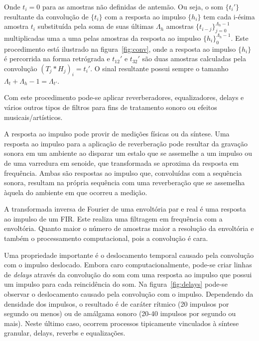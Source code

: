 \begin{itemize}
Onde $t_i=0$ para as
amostras não definidas de antemão.
Ou seja, o som $\{t_i'\}$ resultante da convolução de $\{t_i\}$ com a resposta ao impulso $\{h_i\}$
tem cada i-ésima amostra $t_i$ substituída pela soma de suas últimas $\Lambda_h$ amostras $\{t_{i-j}\}_{j=0}^{\Lambda_h-1}$
multiplicadas uma a uma pelas amostras da resposta ao impulso $\{h_i\}_0^{\Lambda_h-1}$. Este
procedimento está ilustrado na figura~\ref{fig:conv}, onde a resposta ao impulso $\{h_i\}$
é percorrida na forma retrógrada e
$t_{12}'$ e $t_{32}'$ são duas amostras calculadas
pela convolução $(T_j*H_j)_i=t_i'$. O sinal resultante possui
sempre o tamanho $\Lambda_t+\Lambda_h -1=\Lambda_{t'}$.


Com este procedimento pode-se aplicar reverberadores, equalizadores, delays
e vários outros tipos de filtros para fins de tratamento sonoro ou
efeitos musicais/artísticos.
 
A resposta ao impulso pode provir de medições
físicas ou da síntese. Uma resposta 
ao impulso para a aplicação
de reverberação pode resultar da gravação sonora em um ambiente ao disparar
um estalo que se assemelhe a um impulso ou 
de uma varredura em senoide, que transformada se aproxima
da resposta em frequência.
Ambas são respostas ao impulso
que, convoluídas com a sequência sonora, resultam na própria sequência
com uma reverberação que se assemelha àquela do ambiente 
em que ocorreu a medição.\cite{Cook}

A transformada inversa
de Fourier de uma envoltória par e real é uma
resposta ao impulso de um FIR. Este realiza
uma filtragem em frequência com a envoltória.
Quanto maior o número de amostras maior
a resolução da envoltória e também 
o processamento computacional, pois a convolução é cara.

Uma propriedade importante é o deslocamento temporal causado pela convolução com o impulso deslocado. Embora caro computacionalmente, 
pode-se criar linhas de \emph{delays} através da convolução do som com uma resposta ao impulso que possui um impulso
para cada reincidência do som.
Na figura~\ref{fig:delays}
pode-se observar o deslocamento causado pela convolução
com o impulso. Dependendo da densidade dos impulsos, o resultado
é de caráter rítmico (20 impulsos por segundo ou menos) ou de amálgama
sonoro (20-40 impulsos por segundo ou mais). Neste último caso,
ocorrem processos tipicamente vinculados à síntese granular, delays, reverbs e equalizações.


\end{itemize}
